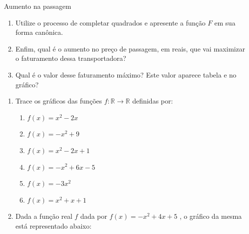 \begin{task}{Aumento na passagem}
\begin{enumerate}
\item {} 
Utilize o processo de completar quadrados  e apresente a função \(F\) em sua forma canônica.

\item {} 
Enfim, qual é o aumento no preço de passagem, em reais, que vai maximizar o faturamento dessa transportadora?

\item {} 
Qual é o valor desse faturamento máximo? Este valor aparece tabela e no gráfico?

\end{enumerate}
\end{task}


\exercise
\label{\detokenize{AF209-7:exercicios}}

\begin{enumerate}

\item Trace os gráficos das funções \(f:\mathbb{R}\to\mathbb{R}\) definidas por:
\begin{enumerate}
\item {} 
\(f(x)=x^2-2x\)

\item {} 
\(f(x)=-x^2+9\)

\item {} 
\(f(x)=x^2-2x+1\)

\item {} 
\(f(x)=-x^2+6x-5\)

\item {} 
\(f(x)=-3x^2\)

\item {} 
\(f(x)=x^2+x+1\)

\end{enumerate}

\item Dada a função real \(f\) dada por \(f(x)=-x^2+4x+5\) , o gráfico da mesma está representado abaixo:
\begin{figure}[H]
\centering

\end{figure}


\end{enumerate}
